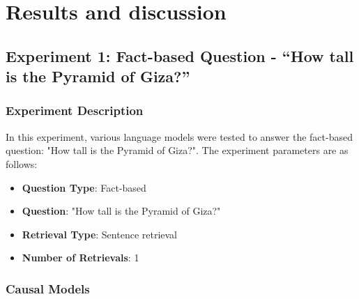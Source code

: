 \documentclass{wseas}
\begin{document}
\section{Results and discussion}

\subsection{Experiment 1: Fact-based Question - ``How tall is the
Pyramid of
Giza?''}

\subsubsection{Experiment Description}
In this experiment, various language models were tested to answer the
fact-based question: "How tall is the Pyramid of Giza?". The
experiment parameters are as follows:

\begin{itemize}
\item
  \textbf{Question Type}: Fact-based
\item
  \textbf{Question}: "How tall is the Pyramid of Giza?"
\item
  \textbf{Retrieval Type}: Sentence retrieval
\item
  \textbf{Number of Retrievals}: 1
\end{itemize}

\subsubsection{Causal Models}
\end{document}
